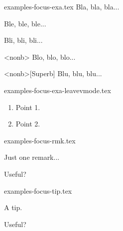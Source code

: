 


\begin{filecontents*}[overwrite]{examples-focus-exa.tex}
    Bla, bla, bla...

    \begin{tdocexa}
        Ble, ble, ble...
    \end{tdocexa}

    \begin{tdocexa}[Wonderful]
        Bli, bli, bli...
    \end{tdocexa}

    \begin{tdocexa}<nonb>
        Blo, blo, blo...
    \end{tdocexa}

    \begin{tdocexa}<nonb>[Superb]
        Blu, blu, blu...
    \end{tdocexa}
\end{filecontents*}


\begin{filecontents*}[overwrite]{examples-focus-exa-leavevmode.tex}
\begin{tdocexa}
    \leavevmode

    \begin{enumerate}
        \item Point 1.

        \item Point 2.
    \end{enumerate}
\end{tdocexa}
\end{filecontents*}


\begin{filecontents*}[overwrite]{examples-focus-rmk.tex}
\begin{tdocrem}
    Just one remark...
\end{tdocrem}

\begin{tdocrem}
    Useful?
\end{tdocrem}
\end{filecontents*}


\begin{filecontents*}[overwrite]{examples-focus-tip.tex}
\begin{tdoctip}
    A tip.
\end{tdoctip}

\begin{tdoctip}
    Useful?
\end{tdoctip}
\end{filecontents*}


